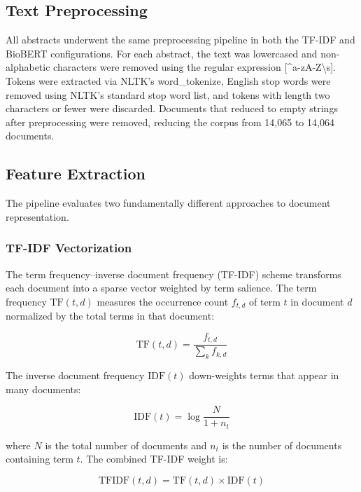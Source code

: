 \documentclass[a4paper,10pt,conference]{IEEEtran}
\begin{document}
\subsection{Text Preprocessing}

All abstracts underwent the same preprocessing pipeline in both the TF-IDF and BioBERT configurations. For each abstract, the text was lowercased and non-alphabetic characters were removed using the regular expression [\textasciicircum a-zA-Z\textbackslash s]. Tokens were extracted via NLTK's word\_tokenize, English stop words were removed using NLTK's standard stop word list, and tokens with length two characters or fewer were discarded. Documents that reduced to empty strings after preprocessing were removed, reducing the corpus from 14,065 to 14,064 documents.

\subsection{Feature Extraction}

The pipeline evaluates two fundamentally different approaches to document representation.

\subsubsection{TF-IDF Vectorization}

The term frequency--inverse document frequency (TF-IDF) scheme transforms each document into a sparse vector weighted by term salience. The term frequency $\text{TF}(t,d)$ measures the occurrence count $f_{t,d}$ of term $t$ in document $d$ normalized by the total terms in that document:

\begin{equation}
\text{TF}(t,d) = \frac{f_{t,d}}{\sum_{k} f_{k,d}}
\end{equation}

The inverse document frequency $\text{IDF}(t)$ down-weights terms that appear in many documents:

\begin{equation}
\text{IDF}(t) = \log \frac{N}{1 + n_t}
\end{equation}

where $N$ is the total number of documents and $n_t$ is the number of documents containing term $t$. The combined TF-IDF weight is:

\begin{equation}
\text{TFIDF}(t,d) = \text{TF}(t,d) \times \text{IDF}(t)
\end{equation}
\end{document}

